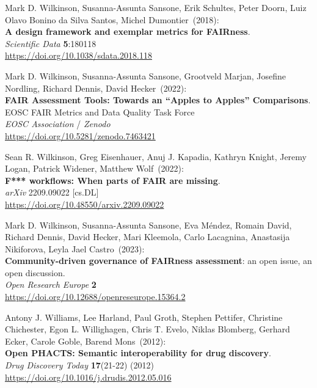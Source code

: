 \begin{thebibliography}{9}
Mark D. Wilkinson, Susanna-Assunta Sansone, Erik Schultes, Peter Doorn, Luiz Olavo Bonino da Silva Santos, Michel Dumontier~(2018): \\
\textbf{A design framework and exemplar metrics for FAIRness}.\\
\emph{Scientific Data} \textbf{5}:180118 \\
\url{https://doi.org/10.1038/sdata.2018.118}

Mark D. Wilkinson, Susanna-Assunta Sansone, Grootveld Marjan, Josefine
Nordling, Richard Dennis, David Hecker~(2022): \\
\textbf{FAIR Assessment Tools: Towards an “Apples to Apples” Comparisons}.\\ 
EOSC FAIR Metrics and Data Quality Task Force\\
\emph{EOSC Association} / \emph{Zenodo}\\
\url{https://doi.org/10.5281/zenodo.7463421}

Sean R. Wilkinson, Greg Eisenhauer, Anuj J. Kapadia, Kathryn Knight,
Jeremy Logan, Patrick Widener, Matthew Wolf~(2022): \\
\textbf{F*** workflows: When parts of {FAIR} are missing}. \\
\emph{arXiv} 2209.09022 [cs.DL] \\
\url{https://doi.org/10.48550/arxiv.2209.09022}

Mark D. Wilkinson, Susanna-Assunta Sansone, Eva Méndez, Romain David, Richard Dennis, David Hecker, Mari Kleemola, Carlo Lacagnina, Anastasija Nikiforova, Leyla Jael Castro~(2023): \\
\textbf{Community-driven governance of FAIRness assessment}: an open issue, an open discussion.\\
\emph{Open Research Europe} \textbf{2}\\
\url{https://doi.org/10.12688/openreseurope.15364.2}

Antony J. Williams, Lee Harland, Paul Groth, Stephen Pettifer, Christine
Chichester, Egon L. Willighagen, Chris T. Evelo, Niklas Blomberg,
Gerhard Ecker, Carole Goble, Barend Mons~(2012): \\
\textbf{Open {PHACTS}: Semantic interoperability for drug discovery}.\\
\emph{Drug Discovery Today} \textbf{17}(21-22) (2012) \\
\url{https://doi.org/10.1016/j.drudis.2012.05.016}


\end{thebibliography}
